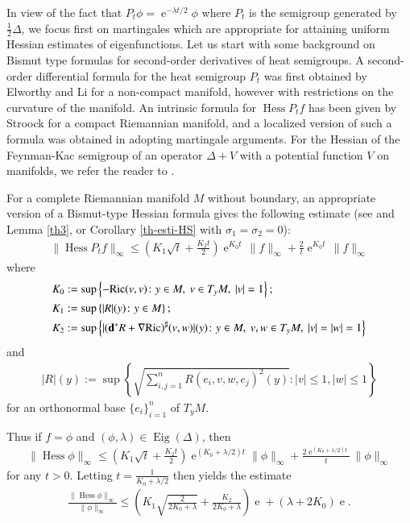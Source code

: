 \documentclass[11pt,reqno]{amsart}
\theoremstyle{definition} \newtheorem{remark}[theorem]{Remark}
\numberwithin{equation}{section}
\def\Ric{{\operatorname{Ric}}} \def\Hess{\operatorname{Hess}}
\newcommand\1{\mathbbm{1}}
\def\Ric{{\operatorname{Ric}}} \def\Aut{{\operatorname{Aut}}}
\def\Eig{\operatorname{Eig}} \def\II{{\operatorname{II}}}
\def\bd{{\bf d}}
\def\r{\right}
\def\l{\left} \def\e{\operatorname{e}} \def\dsum{\displaystyle\sum}
\def\II{{\operatorname{II}}}
\begin{document}
In view of the fact that $P_t\phi=\e^{-\lambda t/2}\phi$ where $P_t$
is the semigroup generated by $\frac12\Delta$, we focus first on
martingales which are appropriate for attaining uniform Hessian
estimates of eigenfunctions.  Let us start with some background on
Bismut type formulas for second-order derivatives of heat
semigroups. A second-order differential formula for the heat semigroup
$P_t$ was first obtained by Elworthy and Li \cite{EL94, Li} for a
non-compact manifold, however with restrictions on the curvature of
the manifold.  An intrinsic formula for $\Hess P_tf$ has been given by
Stroock \cite{Stroock} for a compact Riemannian manifold, and a
localized version of such a formula was obtained in \cite{APT, ChCT} adopting 
martingale arguments.  For the Hessian of the Feynman-Kac
semigroup of an operator $\Delta+V$  with a potential function $V$ on manifolds, we refer the reader to \cite{Li2018,Li2016,Th19}. 

For a complete Riemannian manifold $M$ without boundary,
an appropriate version of a Bismut-type Hessian formula gives the following estimate
(see \cite[Corollary 4.3]{ChCT} and Lemma \ref{th3}, or Corollary \ref{th-esti-HS}  with $\sigma_1=\sigma_2=0$):
\begin{align*}
\|\Hess P_tf\|_{\infty}\leq  \l(K_1 \sqrt{t}+\frac{K_2 t}{2}\r)\e^{K_0t}\,\|f\|_{\infty}+\frac{2}{t}\e^{K_0t}\, \|f\|_{\infty}
\end{align*}
where 
\begin{align}\label{K012}
&K_0:=\sup\l\{-{\rm Ric}(v,v)\colon y\in M,\ v\in T_yM,\ |v|=1\r\};\notag\\
& K_1:=\sup\l\{|R|(y)\colon y\in M \r\};\\
&K_2:=\sup\l\{|(\bd^*R+\nabla \Ric)^{\sharp}(v,w)|(y)\colon y\in M,\ v,w\in T_yM,\ |v|=|w|=1\r\} \notag
\end{align}
and 
\begin{align*}
|R|(y):=\sup \l\{\sqrt{\sum_{i,j=1}^nR(e_i, v, w,e_j)^2(y)}: |v|\leq 1, |w|\leq 1\r\}
\end{align*}
for an orthonormal base $\{e_i\}_{i=1}^n$ of $T_yM$.\smallskip 

Thus if $f=\phi$ and $(\phi,\lambda)\in \Eig(\Delta)$, then 
\begin{align*}
\|\Hess \phi\|_{\infty}\leq \l(K_1 \sqrt{t}+\frac{K_2 t}{2}\r)\e^{(K_0+\lambda/2)t}\|\phi\|_{\infty}+\frac{2\e^{(K_0+\lambda/2)t}}{t}\, \|\phi\|_{\infty}
\end{align*}
for any $t>0$. Letting $t=\frac{1}{K_0+\lambda/2}$ then yields the estimate
\begin{align*}
\frac{\|\Hess \phi\|_{\infty}}{\|\phi\|_{\infty}}\leq \l(K_1\sqrt{\frac{2}{2K_0+\lambda}}+ \frac{K_2}{2K_0+\lambda}\r)\e+(\lambda+2K_0)\e.
\end{align*}
\end{document}
